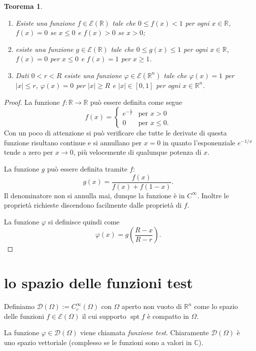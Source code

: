 \documentclass[italian,a4paper,oneside,headinclude]{scrbook}
\renewcommand{\phi}{\varphi}
\newcommand{\D}{\mathcal D}
\newcommand{\E}{\mathcal E}
\newcommand{\CC}{\mathbb C}
\newcommand{\RR}{\mathbb R}
\newcommand{\abs}[1]{{\left|#1\right|}}
\newcommand{\defeq}{:=}
\DeclareMathOperator{\spt}{spt}
\newtheorem{theorem}{Teorema}
\begin{document}
\begin{theorem}\label{th:fun_cpt}
  \begin{enumerate}
    \item
      Esiste una funzione $f\in \E(\RR)$ tale che $0\le f(x)< 1$
      per ogni $x \in \RR$,
      $f(x) = 0$ se $x\le 0$ e $f(x) > 0$ se $x>0$;
    \item
      esiste una funzione $g\in \E(\RR)$ tale che $0\le g(x)
      \le 1$ per ogni $x\in \RR$, $f(x)=0$ per $x\le 0$ e $f(x)=1$ per
      $x\ge 1$.
    \item
      Dati $0<r<R$ esiste una funzione $\phi\in \E(\RR^n)$ tale
      che $\phi(x) = 1$ per $\abs{x}\le r$, $\phi(x)=0$ per
      $\abs{x}\ge R$ e $\abs{x} \in [0,1]$ per ogni $x\in \RR^n$.
  \end{enumerate}
\end{theorem}
%
\begin{proof}
  La funzione $f\colon \RR \to \RR$ può essere definita come segue
  \[
  f(x) =
  \begin{cases}
    e^{-\frac{1}{x}}& \text{per $x>0$}\\
    0 & \text{per $x\le 0$}.
  \end{cases}
  \]
  Con un poco di attenzione si può verificare che tutte le derivate di
  questa funzione risultano continue e si annullano per $x=0$ in
  quanto l'esponenziale $e^{-1/x}$ tende a zero per $x\to 0$, più
  velocemente di qualunque potenza di $x$.

  La funzione $g$ può essere definita tramite $f$:
  \[
  g(x) = \frac{f(x)}{f(x) + f(1-x)}.
  \]
  Il denominatore non si annulla mai, dunque la funzione è in
  $C^\infty$. Inoltre le proprietà richieste discendono facilmente
  dalle proprietà di $f$.

  La funzione $\phi$ si definisce quindi come
  \[
  \phi(x) = g\left(\frac{R-x}{R-r}\right).
  \]
\end{proof}

\section{lo spazio delle funzioni test}

Definiamo $\D(\Omega) \defeq C_c^\infty(\Omega)$ con $\Omega$ aperto non
\marginpar{$\D(\Omega)$}
vuoto di $\RR^n$ come lo spazio delle funzioni $f\in \E(\Omega)$
il cui supporto $\spt f$ è compatto in $\Omega$.

La funzione $\phi\in\D(\Omega)$ viene chiamata
\emph{funzione test}.
Chiaramente $\D(\Omega)$ è uno spazio vettoriale
(complesso se le funzioni sono a valori in $\CC$).
\end{document}
